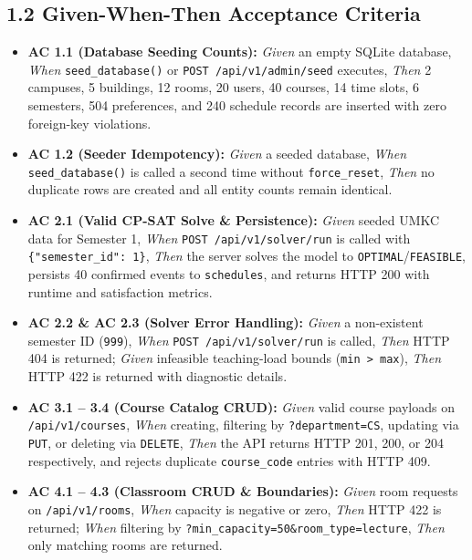 \documentclass[10pt,letterpaper]{article}
\begin{document}
\subsection*{1.2 Given-When-Then Acceptance Criteria}
\begin{itemize}[leftmargin=1.5em, itemsep=3pt, topsep=3pt]
    \small
    \item \textbf{AC 1.1 (Database Seeding Counts):} \textit{Given} an empty SQLite database, \textit{When} \texttt{seed\_database()} or \texttt{POST /api/v1/admin/seed} executes, \textit{Then} 2 campuses, 5 buildings, 12 rooms, 20 users, 40 courses, 14 time slots, 6 semesters, 504 preferences, and 240 schedule records are inserted with zero foreign-key violations.
    \item \textbf{AC 1.2 (Seeder Idempotency):} \textit{Given} a seeded database, \textit{When} \texttt{seed\_database()} is called a second time without \texttt{force\_reset}, \textit{Then} no duplicate rows are created and all entity counts remain identical.
    \item \textbf{AC 2.1 (Valid CP-SAT Solve \& Persistence):} \textit{Given} seeded UMKC data for Semester 1, \textit{When} \texttt{POST /api/v1/solver/run} is called with \texttt{\{"semester\_id": 1\}}, \textit{Then} the server solves the model to \texttt{OPTIMAL}/\texttt{FEASIBLE}, persists 40 confirmed events to \texttt{schedules}, and returns HTTP 200 with runtime and satisfaction metrics.
    \item \textbf{AC 2.2 \& AC 2.3 (Solver Error Handling):} \textit{Given} a non-existent semester ID (\texttt{999}), \textit{When} \texttt{POST /api/v1/solver/run} is called, \textit{Then} HTTP 404 is returned; \textit{Given} infeasible teaching-load bounds (\texttt{min > max}), \textit{Then} HTTP 422 is returned with diagnostic details.
    \item \textbf{AC 3.1 -- 3.4 (Course Catalog CRUD):} \textit{Given} valid course payloads on \texttt{/api/v1/courses}, \textit{When} creating, filtering by \texttt{?department=CS}, updating via \texttt{PUT}, or deleting via \texttt{DELETE}, \textit{Then} the API returns HTTP 201, 200, or 204 respectively, and rejects duplicate \texttt{course\_code} entries with HTTP 409.
    \item \textbf{AC 4.1 -- 4.3 (Classroom CRUD \& Boundaries):} \textit{Given} room requests on \texttt{/api/v1/rooms}, \textit{When} capacity is negative or zero, \textit{Then} HTTP 422 is returned; \textit{When} filtering by \texttt{?min\_capacity=50\&room\_type=lecture}, \textit{Then} only matching rooms are returned.

\end{itemize}
\end{document}
